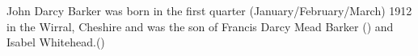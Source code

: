 
John Darcy Barker was born in the first quarter (January/February/March) 1912 in the Wirral, Cheshire \cite{JDBbirthref} and was the son of Francis Darcy Mead Barker () and Isabel Whitehead.()


